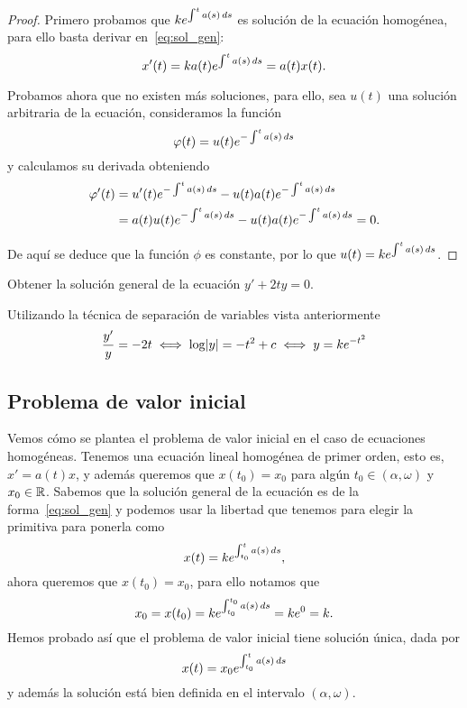 \documentclass[../ecuaciones_diferenciales.tex]{subfiles}
\begin{document}
\begin{proof}
	Primero probamos que \(k e^{\int^t a(s) \mathop{d\!} s}\) es
	solución de la ecuación homogénea, para ello basta derivar
	en~\eqref{eq:sol_gen}:
	\[x'(t) = k a(t) e^{\int^t a(s) \mathop{d\!} s} = a(t) x(t).\]

	Probamos ahora que no existen más soluciones, para ello, sea \(u(t)\) una
	solución arbitraria de la ecuación, consideramos la función
	\[\varphi(t) = u(t) e^{-\int^t a(s) \mathop{d\!} s}\]
	y calculamos su derivada obteniendo
	\begin{align*}
		\varphi'(t) & = u'(t) e^{-\int^t a(s) \mathop{d\!} s}
		- u(t) a(t) e^{-\int^t a(s) \mathop{d\!} s}            \\
		         & = a(t) u(t) e^{-\int^t a(s) \mathop{d\!} s}
		- u(t) a(t) e^{-\int^t a(s) \mathop{d\!} s} = 0.
	\end{align*}

	De aquí se deduce que la función \(\phi\) es constante, por lo que
	\(u(t) = k e^{\int^t a(s) \mathop{d\!} s}\).
\end{proof}

\begin{example}
	Obtener la solución general de la ecuación \(y' + 2ty = 0\).
\end{example}

\begin{solution}
	Utilizando la técnica de separación de variables vista anteriormente
	\[\frac{y'}{y} = -2t \iff \log\abs{y} = -t^2 + c \iff y = k e^{-t^2}\]
\end{solution}

\subsection{Problema de valor inicial} \label{sec:pvi}

Vemos cómo se plantea el problema de valor inicial en el caso de ecuaciones
homogéneas. Tenemos una ecuación lineal homogénea de primer orden, esto es,
\(x' = a(t)x\), y además queremos que \(x(t_0) = x_0\) para algún
\(t_0 \in (\alpha, \omega)\) y \(x_0 \in \mathbb{R}\).
Sabemos que la solución general de la ecuación es de la forma~\eqref{eq:sol_gen}
y podemos usar la libertad que tenemos para elegir la primitiva para ponerla como
\[x(t) = k e^{\int_{t_0}^t a(s) \mathop{d\!} s},\]
ahora queremos que \(x(t_0) = x_0\), para ello notamos que
\[x_0 = x(t_0) = k e^{\int_{t_0}^{t_0} a(s) \mathop{d\!} s} = ke^0 = k.\]
Hemos probado así que el problema de valor inicial tiene solución única,
dada por
\begin{equation}
	x(t) = x_0 e^{\int_{t_0}^t a(s) \mathop{d\!} s} \label{eq:sol_pvi}
\end{equation}
y además la solución está bien definida en el intervalo \((\alpha, \omega)\).
\end{document}
